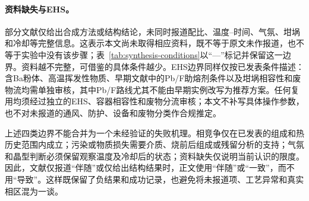 \paragraph{资料缺失与EHS。}
部分文献仅给出合成方法或结构结论，未同时报道配比、温度--时间、气氛、坩埚和冷却等完整信息\cite{ababaikeri2024ba5y12zn,ababaikeri2024ba3zn4si4o15,kaiser2002crystal,cai2024optimized,zhao2026crystal}。这表示本文尚未取得相应资料，既不等于原文未作报道，也不等于实验中没有该步骤；表~\ref{tab:synthesis-conditions}\CJKecglue{}以“—”标记并保留这一边界。资料越不完整，可借鉴的具体条件越少。EHS边界同样仅按已发表条件描述：含Ba粉体、高温挥发性物质、早期文献中的Pb\slash F助熔剂条件以及坩埚相容性和废物流均需单独审核，其中Pb\slash F路线尤其不能由早期实例改写为推荐方案\cite{giess1982zn2sio4}。任何复用均须经过独立的EHS、容器相容性和废物分流审核；本文不补写具体操作参数，也不对未报道的通风、防护、设备和废物分类作合规推定。

上述四类边界不能合并为一个未经验证的失败机理。相竞争仅在已发表的组成和热历史范围内成立；污染或物质损失需要介质、烧前后组成或残留分析的支持；气氛和晶型判断必须保留观察温度及冷却后的状态；资料缺失仅说明当前认识的限度。因此，文献仅报道“伴随”或仅给出结构结果时，正文使用“伴随”或“一致”，而不用“导致”。这样既保留了负结果和成功记录，也避免将未报道项、工艺异常和真实相区混为一谈。
